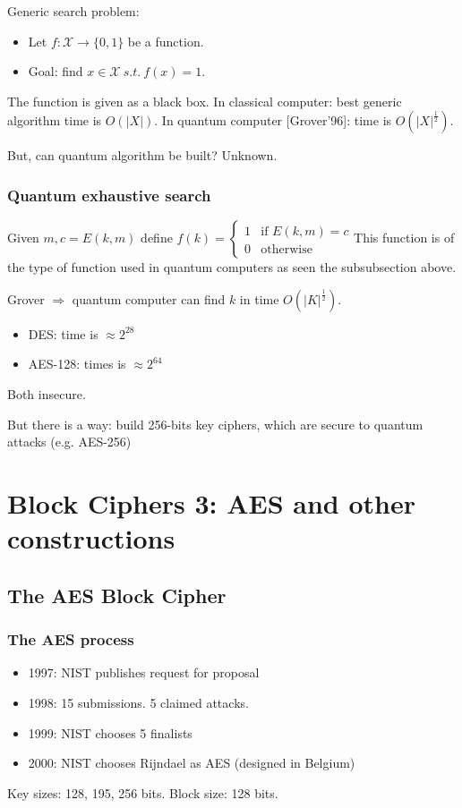 \documentclass[12pt]{book}
\begin{document}
Generic search problem:
\begin{itemize}
	\item[] Let $f:\mathcal{X}\rightarrow\{0,1\}$ be a function.
	\item[] Goal: find $x\in\mathcal{X}\ s.t.\ f(x)=1$.
\end{itemize}

The function is given as a black box. In classical computer: best generic algorithm time is $O(|X|)$. In quantum computer [Grover'96]: time is $O(|X|^{\frac{1}{2}})$.

But, can quantum algorithm be built? Unknown.

\subsubsection{Quantum exhaustive search}
Given $m,c=E(k,m)$ define $f(k)=\left\{\begin{array}{ll}
	1&\text{if }E(k,m)=c\\
	0&\text{otherwise}
\end{array}\right.$This function is of the type of function used in quantum computers as seen the subsubsection above.

Grover $\Rightarrow$ quantum computer can find $k$ in time $O(|K|^{\frac{1}{2}})$.
\begin{itemize}
	\item DES: time is $\approx2^{28}$
	\item AES-128: times is $\approx2^{64}$
\end{itemize}Both insecure.

But there is a way: build 256-bits key ciphers, which are secure to quantum attacks (e.g. AES-256)

\newpage
\section{Block Ciphers 3: AES and other constructions}
\subsection{The AES Block Cipher}
\subsubsection{The AES process}
\begin{itemize}
	\item 1997: NIST publishes request for proposal
	\item 1998: 15 submissions. 5 claimed attacks.
	\item 1999: NIST chooses 5 finalists
	\item 2000: NIST chooses Rijndael as AES (designed in Belgium)
\end{itemize}
Key sizes: 128, 195, 256 bits. Block size: 128 bits.
\end{document}
